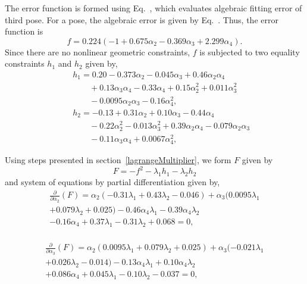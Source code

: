 The error function is formed using Eq.~, which evaluates algebraic fitting error of third pose. For a pose, the algebraic error is given by Eq.~. Thus, the error function is
\begin{equation}
f =  0.224 (-1+0.675 \alpha _2-0.369 \alpha _3+2.299 \alpha _4).
\end{equation}
Since there are no nonlinear geometric constraints, $f$ is subjected to two equality constraints $h_1$ and $h_2$ given by,
\begin{eqnarray}
& & h_1 = 0.20 -0.373 \alpha _2-0.045 \alpha _3 +0.46 \alpha _2 \alpha _4 \nonumber \\
& & \ \ \ \ \ \ \ \ \  +0.13 \alpha _3 \alpha _4-0.33 \alpha _4+ 0.15 \alpha _2^2+0.011 \alpha _3^2 \nonumber \\
& & \ \ \ \ \ \ \ \ \ -0.0095 \alpha _2 \alpha _3-0.16\alpha _4^2, \\
& & h_2  = -0.13 +0.31 \alpha _2+0.10 \alpha _3 -0.44 \alpha _4 \nonumber \\
& & \ \ \ \ \ \ \ \ \  -0.22 \alpha _2^2-0.013 \alpha _3^2+0.39 \alpha _2 \alpha _4-0.079 \alpha _2 \alpha _3 \nonumber \\ & & \ \ \ \ \ \ \ \ \ -0.11 \alpha _3 \alpha _4+0.0067\alpha _4^2,
\end{eqnarray}

Using steps presented in section~\ref{lagrangeMultiplier}, we form $F$ given by
\begin{equation}
F = -{f}^2 - \lambda_1h_1 -  \lambda_2h_2
\end{equation}
and system of equations by partial differentiation given by,
\begin{equation}
\begin{array}{c}
 \frac{\partial}{\partial \alpha_2}(F) = {\alpha_2} (-0.31 {\lambda_1}+0.43 {\lambda_2}-0.046)+{\alpha_3} (0.0095 {\lambda_1}\\+0.079 {\lambda_2}+0.025)-0.46 {\alpha_4} {\lambda_1}-0.39 {\alpha_4} {\lambda_2}\\-0.16 {\alpha_4}+0.37 {\lambda_1}-0.31 {\lambda_2}+0.068 = 0, \\
 \end{array}
\end{equation}

 \begin{equation}
\begin{array}{c}
 \frac{\partial}{\partial \alpha_3}(F) = {\alpha_2} (0.0095 {\lambda_1}+0.079 {\lambda_2}+0.025)+{\alpha_3} (-0.021 {\lambda_1}\\+0.026 {\lambda_2}-0.014)-0.13 {\alpha_4} {\lambda_1}+0.10 {\alpha_4} {\lambda_2}\\+0.086 {\alpha_4}+0.045 {\lambda_1}-0.10 {\lambda_2}-0.037 = 0, \\
 \end{array}
\end{equation}

